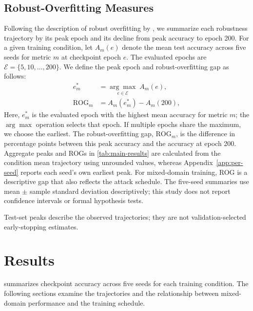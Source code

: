 \documentclass{article}
\newcommand{\E}{\mathcal{E}}
\begin{document}
\subsection{Robust-Overfitting Measures}
\label{sec:overfitting-measures}
Following the description of robust overfitting by \citet{rice2020},
we summarize each robustness trajectory by its peak epoch and its decline
from peak accuracy to epoch 200.
For a given training condition, let $A_m(e)$ denote the mean test accuracy
across five seeds for metric $m$ at checkpoint epoch $e$. The evaluated epochs
are $\E=\{5,10,\ldots,200\}$. We define the peak epoch and robust-overfitting
gap as follows:
\begin{align}
  e_m^* &= \underset{e\in\E}{\arg\max}\;A_m(e), \\
  \mathrm{ROG}_m &= A_m(e_m^*)-A_m(200),
  \label{eq:robust-overfitting-gap}
\end{align}
Here, $e_m^*$ is the evaluated epoch with the highest mean accuracy for
metric $m$; the $\arg\max$ operation selects that epoch. If multiple epochs
share the maximum, we choose the earliest. The robust-overfitting gap,
$\mathrm{ROG}_m$, is the difference in percentage points between this peak
accuracy and the accuracy at epoch 200. Aggregate peaks and ROGs
in \cref{tab:main-results} are calculated
from the condition mean trajectory using unrounded values, whereas
Appendix~\ref{app:per-seed} reports each seed's own earliest peak. For mixed-domain
training, ROG is a descriptive gap that also reflects the attack schedule.
The five-seed summaries use mean $\pm$ sample
standard deviation descriptively; this study does not report confidence
intervals or formal hypothesis tests.

Test-set peaks describe the observed trajectories; they are not
validation-selected early-stopping estimates.

\section{Results}
\label{sec:results}

 summarizes checkpoint accuracy across five seeds for
each training condition. The following sections examine the trajectories and
the relationship between mixed-domain performance and the training schedule.
\end{document}

